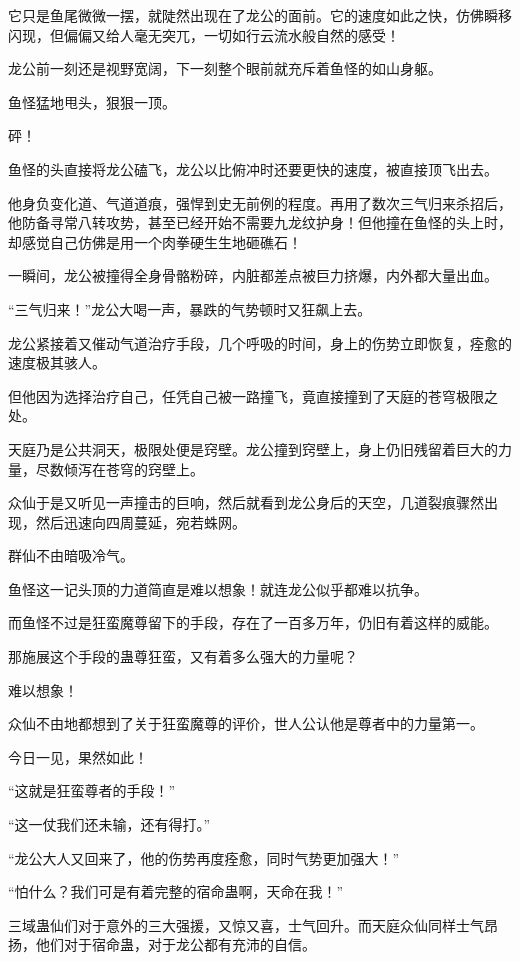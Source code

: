\begin{this_body}
它只是鱼尾微微一摆，就陡然出现在了龙公的面前。它的速度如此之快，仿佛瞬移闪现，但偏偏又给人毫无突兀，一切如行云流水般自然的感受！

龙公前一刻还是视野宽阔，下一刻整个眼前就充斥着鱼怪的如山身躯。

鱼怪猛地甩头，狠狠一顶。

砰！

鱼怪的头直接将龙公磕飞，龙公以比俯冲时还要更快的速度，被直接顶飞出去。

他身负变化道、气道道痕，强悍到史无前例的程度。再用了数次三气归来杀招后，他防备寻常八转攻势，甚至已经开始不需要九龙纹护身！但他撞在鱼怪的头上时，却感觉自己仿佛是用一个肉拳硬生生地砸礁石！

一瞬间，龙公被撞得全身骨骼粉碎，内脏都差点被巨力挤爆，内外都大量出血。

“三气归来！”龙公大喝一声，暴跌的气势顿时又狂飙上去。

龙公紧接着又催动气道治疗手段，几个呼吸的时间，身上的伤势立即恢复，痊愈的速度极其骇人。

但他因为选择治疗自己，任凭自己被一路撞飞，竟直接撞到了天庭的苍穹极限之处。

天庭乃是公共洞天，极限处便是窍壁。龙公撞到窍壁上，身上仍旧残留着巨大的力量，尽数倾泻在苍穹的窍壁上。

众仙于是又听见一声撞击的巨响，然后就看到龙公身后的天空，几道裂痕骤然出现，然后迅速向四周蔓延，宛若蛛网。

群仙不由暗吸冷气。

鱼怪这一记头顶的力道简直是难以想象！就连龙公似乎都难以抗争。

而鱼怪不过是狂蛮魔尊留下的手段，存在了一百多万年，仍旧有着这样的威能。

那施展这个手段的蛊尊狂蛮，又有着多么强大的力量呢？

难以想象！

众仙不由地都想到了关于狂蛮魔尊的评价，世人公认他是尊者中的力量第一。

今日一见，果然如此！

“这就是狂蛮尊者的手段！”

“这一仗我们还未输，还有得打。”

“龙公大人又回来了，他的伤势再度痊愈，同时气势更加强大！”

“怕什么？我们可是有着完整的宿命蛊啊，天命在我！”

三域蛊仙们对于意外的三大强援，又惊又喜，士气回升。而天庭众仙同样士气昂扬，他们对于宿命蛊，对于龙公都有充沛的自信。


\end{this_body}
